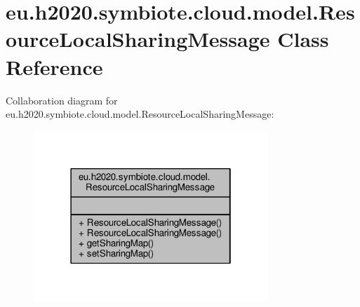 \hypertarget{classeu_1_1h2020_1_1symbiote_1_1cloud_1_1model_1_1ResourceLocalSharingMessage}{}\section{eu.\+h2020.\+symbiote.\+cloud.\+model.\+Resource\+Local\+Sharing\+Message Class Reference}
\label{classeu_1_1h2020_1_1symbiote_1_1cloud_1_1model_1_1ResourceLocalSharingMessage}


Collaboration diagram for eu.\+h2020.\+symbiote.\+cloud.\+model.\+Resource\+Local\+Sharing\+Message\+:
\nopagebreak
\begin{figure}[H]
\begin{center}
\leavevmode
\includegraphics[width=250pt]{classeu_1_1h2020_1_1symbiote_1_1cloud_1_1model_1_1ResourceLocalSharingMessage__coll__graph}
\end{center}
\end{figure}
